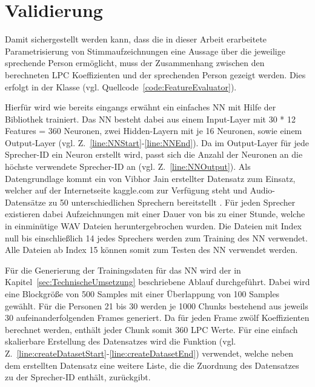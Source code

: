 \section{Validierung}\label{sec:Validierung}
Damit sichergestellt werden kann, dass die in dieser Arbeit erarbeitete Parametrisierung von Stimmaufzeichnungen eine Aussage über die jeweilige sprechende Person ermöglicht, muss der Zusammenhang zwischen den berechneten \ac{LPC} Koeffizienten und der sprechenden Person gezeigt werden.
Dies erfolgt in der Klasse  (vgl. Quellcode~\ref{code:FeatureEvaluator}).

Hierfür wird wie bereits eingangs erwähnt ein einfaches \ac{NN} mit Hilfe der Bibliothek  trainiert.
Das \ac{NN} besteht dabei aus einem Input-Layer mit 30 * 12 Features = 360 Neuronen, zwei Hidden-Layern mit je 16 Neuronen, sowie einem Output-Layer (vgl. Z.~\ref{line:NNStart}-\ref{line:NNEnd}).
Da im Output-Layer für jede Sprecher-ID ein Neuron erstellt wird, passt sich die Anzahl der Neuronen an die höchste verwendete Sprecher-ID an (vgl. Z.~\ref{line:NNOutput}).
\newline
\newline
Als Datengrundlage kommt ein von Vibhor Jain erstellter Datensatz zum Einsatz, welcher auf der Internetseite kaggle.com zur Verfügung steht und Audio-Datensätze zu 50 unterschiedlichen Sprechern bereitstellt \autocite[vgl.][]{vibhor_jain_speaker_2019}.
Für jeden Sprecher existieren dabei Aufzeichnungen mit einer Dauer von bis zu einer Stunde, welche in einminütige WAV Dateien heruntergebrochen wurden.
Die Dateien mit Index null bis einschließlich 14 jedes Sprechers werden zum Training des \ac{NN} verwendet.
Alle Dateien ab Index 15 können somit zum Testen des \ac{NN} verwendet werden.

Für die Generierung der Trainingsdaten für das \ac{NN} wird der in Kapitel~\ref{sec:TechnischeUmsetzung} beschriebene Ablauf durchgeführt.
Dabei wird eine Blockgröße von 500 Samples mit einer Überlappung von 100 Samples gewählt.
Für die Personen 21 bis 30 werden je 1000 Chunks bestehend aus jeweils 30 aufeinanderfolgenden Frames generiert.
Da für jeden Frame zwölf Koeffizienten berechnet werden, enthält jeder Chunk somit 360 \ac{LPC} Werte.
Für eine einfach skalierbare Erstellung des Datensatzes wird die Funktion  (vgl. Z.~\ref{line:createDatasetStart}-\ref{line:createDatasetEnd}) verwendet, welche neben dem erstellten Datensatz eine weitere Liste, die die Zuordnung des Datensatzes zu der Sprecher-ID enthält, zurückgibt.

